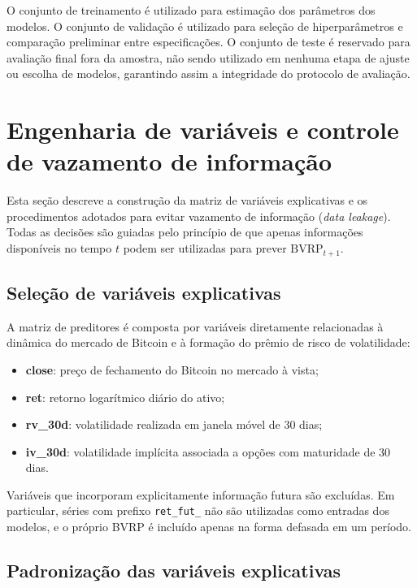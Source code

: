O conjunto de treinamento é utilizado para estimação dos parâmetros dos modelos.
O conjunto de validação é utilizado para seleção de hiperparâmetros e comparação
preliminar entre especificações. O conjunto de teste é reservado para avaliação
final fora da amostra, não sendo utilizado em nenhuma etapa de ajuste ou escolha
de modelos, garantindo assim a integridade do protocolo de avaliação.

\section{Engenharia de variáveis e controle de vazamento de informação}
\label{sec:cap6_features}

Esta seção descreve a construção da matriz de variáveis explicativas e os
procedimentos adotados para evitar vazamento de informação (\textit{data leakage}).
Todas as decisões são guiadas pelo princípio de que apenas informações disponíveis
no tempo $t$ podem ser utilizadas para prever $\text{BVRP}_{t+1}$.

\subsection{Seleção de variáveis explicativas}
\label{subsec:cap6_features_selection}

A matriz de preditores é composta por variáveis diretamente relacionadas à dinâmica
do mercado de Bitcoin e à formação do prêmio de risco de volatilidade:
\begin{itemize}
    \item \textbf{close}: preço de fechamento do Bitcoin no mercado à vista;
    \item \textbf{ret}: retorno logarítmico diário do ativo;
    \item \textbf{rv\_30d}: volatilidade realizada em janela móvel de 30 dias;
    \item \textbf{iv\_30d}: volatilidade implícita associada a opções com maturidade de 30 dias.
\end{itemize}

Variáveis que incorporam explicitamente informação futura são excluídas. Em
particular, séries com prefixo \texttt{ret\_fut\_} não são utilizadas como entradas
dos modelos, e o próprio BVRP é incluído apenas na forma defasada em um período.

\subsection{Padronização das variáveis explicativas}
\label{subsec:cap6_scaling}

